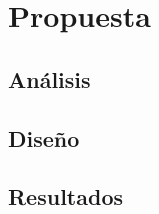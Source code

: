 
\chapter{Propuesta} %

\label{Chapter3} %


\section{Análisis}
\lipsum

\section{Diseño}
\lipsum

\section{Resultados}
\lipsum
